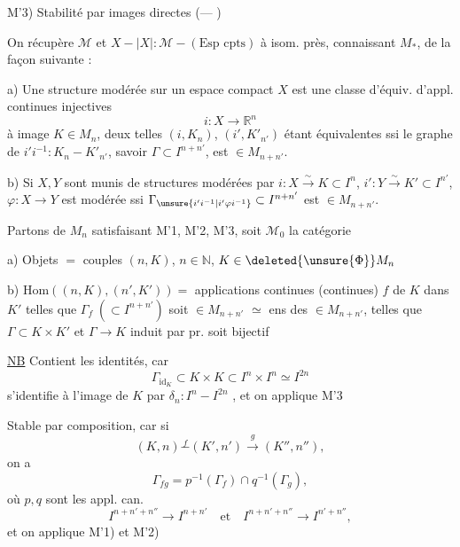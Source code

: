 M'3) Stabilité par images directes ($\text{---}$ )


On récupère $\mathcal M$ et $X-|X|:\mathcal M-(\text{Esp cpts})$ à isom. près, connaissant $M_*$, de la façon suivante :

a) Une structure modérée sur un espace compact $X$ est une classe d'équiv. d'appl. continues injectives
\[
i:X\longrightarrow\mathbb R^n
\]
à image $K\in M_n$, deux telles $(i,K_n)$, $(i',K'_{n'})$ étant équivalentes ssi le graphe de $i'i^{-1}:K_n-K'_{n'}$, savoir $\Gamma\subset I^{n+n'}$, est  $\in M_{n+n'}$.

b) Si $X,Y$ sont munis de structures modérées par $i:X\xrightarrow{\sim}K\subset I^n$, $i':Y\xrightarrow{\sim}K'\subset I^{n'}$, $\varphi:X\longrightarrow Y$ est modérée ssi $\Gamma_{\unsure{i'i^{-1}|i'\varphi i^{-1}}}\subset I^{n+n'}$ est $\in M_{n+n'}$.


Partons de $M_n$ satisfaisant M'1, M'2, M'3, soit $\mathcal M_0$ la catégorie  


a) Objets $=$ couples $(n,K)$, $n\in\mathbb N$, $K\in\deleted{\unsure{\Phi}}M_n$

b) $\mathrm{Hom}((n,K),(n',K'))=$   applications continues (continues) $f$ de $K$ dans $K'$ telles que $\Gamma_f\;(\subset I^{n+n'})$ soit $\in M_{n+n'}$
$\simeq$ ens des \inserted{$\Gamma$} $\in M_{n+n'}$, telles que $\Gamma\subset K\times K'$ et $\Gamma\longrightarrow K$ induit par pr. soit bijectif


\uline{NB} Contient les identités, car
\[
\Gamma_{\mathrm{id}_K}\subset K\times K\subset I^n\times I^n\simeq I^{2n}
\]
s'identifie à  l'image de $K$ par $\delta_n:I^n-I^{2n}$ , et on applique M'3

 Stable par composition, car
 si 
\[
(K,n)\mathrel{\overset{f}{-}}(K',n')\xrightarrow{g}(K'',n''),
\]
on a
\[
\Gamma_{fg}=p^{-1}(\Gamma_f)\cap q^{-1}(\Gamma_g),
\]
où $p,q$ sont les appl. can.
\[
I^{n+n'+n''}\longrightarrow I^{n+n'}
\quad\text{et}\quad
I^{n+n'+n''}\longrightarrow I^{n'+n''},
\]
et on applique M'1) et M'2)

